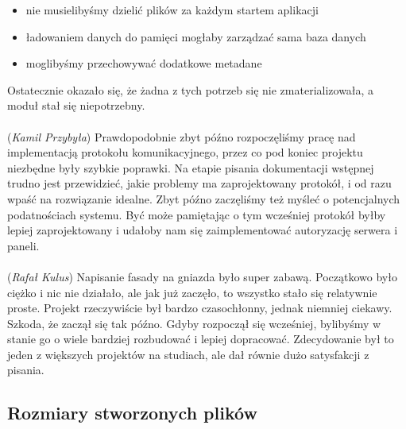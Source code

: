 \documentclass[12pt, a4paper]{article}
\begin{document}
\begin{itemize}
\item nie musielibyśmy dzielić plików za każdym startem aplikacji
\item ładowaniem danych do pamięci mogłaby zarządzać sama baza danych
\item moglibyśmy przechowywać dodatkowe metadane
\end{itemize}
Ostatecznie okazało się, że żadna z tych potrzeb się nie zmaterializowała, a moduł stał się niepotrzebny.
\\
\\
(\textit{Kamil Przybyła}) Prawdopodobnie zbyt późno rozpoczęliśmy pracę nad implementacją protokołu komunikacyjnego, przez co pod koniec projektu niezbędne były szybkie poprawki. Na etapie pisania dokumentacji wstępnej trudno jest przewidzieć, jakie problemy ma zaprojektowany protokół, i od razu wpaść na rozwiązanie idealne. Zbyt późno zaczęliśmy też myśleć o potencjalnych podatnościach systemu. Być może pamiętając o tym wcześniej protokół byłby lepiej zaprojektowany i udałoby nam się zaimplementować autoryzację serwera i paneli.
\\
\\
(\textit{Rafał Kulus}) Napisanie fasady na gniazda było super zabawą. Początkowo było ciężko i nic nie działało, ale jak już zaczęło, to wszystko stało się relatywnie proste. Projekt rzeczywiście był bardzo czasochłonny, jednak niemniej ciekawy. Szkoda, że zaczął się tak późno. Gdyby rozpoczął się wcześniej, bylibyśmy w stanie go o wiele bardziej rozbudować i lepiej dopracować. Zdecydowanie był to jeden z większych projektów na studiach, ale dał równie dużo satysfakcji z pisania.

\hypertarget{pliki}{%
\subsection{Rozmiary stworzonych plików}\label{pliki}}
\end{document}
